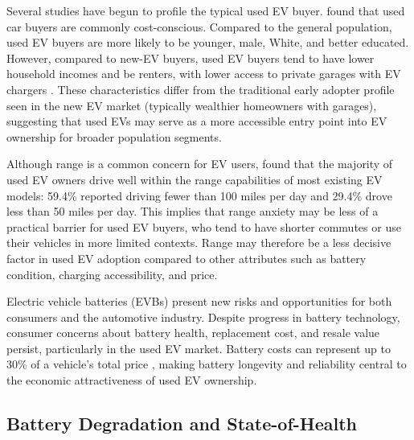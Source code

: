 \documentclass[a4paper,fleqn]{cas-sc}   %
\begin{document}
Several studies have begun to profile the typical used EV buyer. \textcite{canepaEarlyLookPlugin2019} found that used car buyers are commonly cost-conscious. Compared to the general population, used EV buyers are more likely to be younger, male, White, and better educated. However, compared to new-EV buyers, used EV buyers tend to have lower household incomes and be renters, with lower access to private garages with EV chargers \parencite{khaloeiHowDoesCharging2020, sheykhfardAnalyzingPurchaseIntentions2025}. These characteristics differ from the traditional early adopter profile seen in the new EV market (typically wealthier homeowners with garages), suggesting that used EVs may serve as a more accessible entry point into EV ownership for broader population segments.

Although range is a common concern for EV users, \textcite{sheykhfardAnalyzingPurchaseIntentions2025} found that the majority of used EV owners drive well within the range capabilities of most existing EV models: 59.4\% reported driving fewer than 100 miles per day and 29.4\% drove less than 50 miles per day. This implies that range anxiety may be less of a practical barrier for used EV buyers, who tend to have shorter commutes or use their vehicles in more limited contexts. Range may therefore be a less decisive factor in used EV adoption compared to other attributes such as battery condition, charging accessibility, and price.

Electric vehicle batteries (EVBs) present new risks and opportunities for both consumers and the automotive industry. Despite progress in battery technology, consumer concerns about battery health, replacement cost, and resale value persist, particularly in the used EV market. Battery costs can represent up to 30\% of a vehicle's total price \parencite{boudwayBatteriesElectricCars2020}, making battery longevity and reliability central to the economic attractiveness of used EV ownership.

\subsection{Battery Degradation and State-of-Health}
\end{document}
